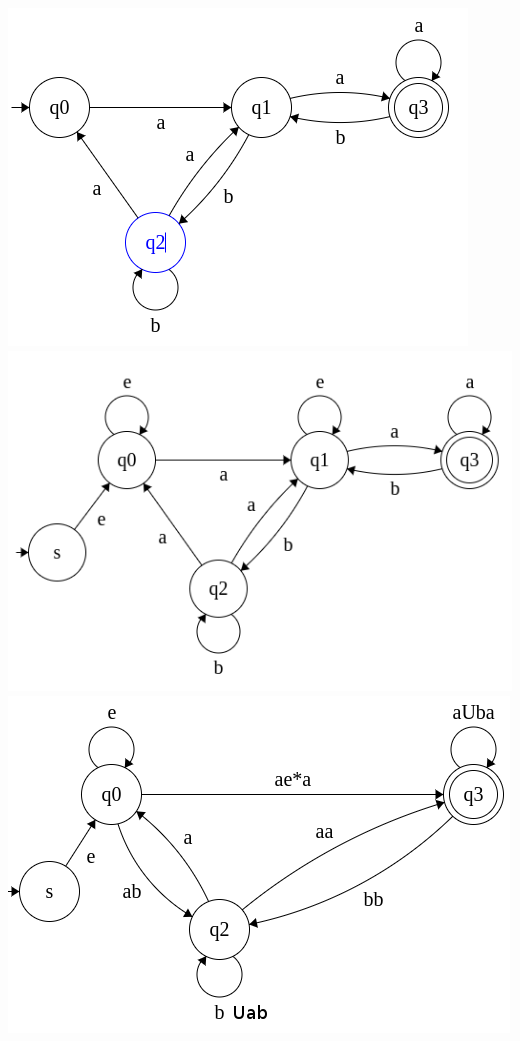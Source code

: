 \documentclass[11pt]{article}
\begin{document}
\includegraphics[scale=0.5]{4a.png}\\
\includegraphics[scale=0.5]{4b.png}\\
\includegraphics[scale=0.5]{4c.png}\\
\end{document}
